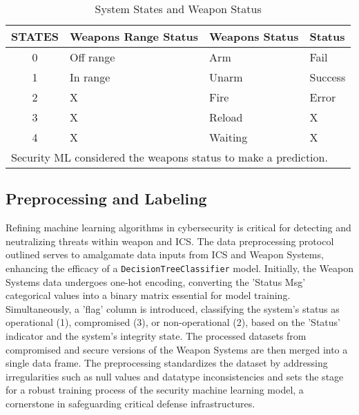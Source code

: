 \documentclass[conference]{IEEEtran}
\begin{document}
\begin{table}[htbp]
\centering
\caption{System States and Weapon Status}
\label{tab:sec_status}
\begin{tabular}{clll}
\toprule
\textbf{STATES} & \textbf{Weapons Range Status} & \textbf{Weapons Status} & \textbf{Status} \\
\midrule
0 & Off range & Arm & Fail \\
1 & In range & Unarm & Success \\
2 & X & Fire & Error \\
3 & X & Reload & X \\
4 & X & Waiting & X \\
\bottomrule
\multicolumn{4}{l}{\footnotesize Security ML considered the weapons status to make a prediction.}
\end{tabular}
\end{table}


\subsection{Preprocessing and Labeling}
Refining machine learning algorithms in cybersecurity is critical for detecting and neutralizing threats within weapon and ICS. The data preprocessing protocol outlined serves to amalgamate data inputs from ICS and Weapon Systems, enhancing the efficacy of a \texttt{DecisionTreeClassifier} model. Initially, the Weapon Systems data undergoes one-hot encoding, converting the 'Status Msg' categorical values into a binary matrix essential for model training. Simultaneously, a 'flag' column is introduced, classifying the system's status as operational (1), compromised (3), or non-operational (2), based on the 'Status' indicator and the system's integrity state.
The processed datasets from compromised and secure versions of the Weapon Systems are then merged into a single data frame. The preprocessing standardizes the dataset by addressing irregularities such as null values and datatype inconsistencies and sets the stage for a robust training process of the security machine learning model, a cornerstone in safeguarding critical defense infrastructures.
\end{document}
